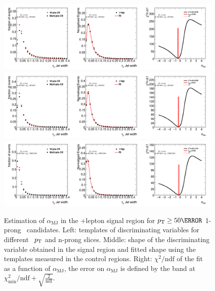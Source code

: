		\begin{figure}
		\begin{center}
		\includegraphics[width=1\textwidth]{chapters/chapter6_HPlus/images/FFs/FFs_FIT_SR_TAULEP_1_50_60.png}
		\includegraphics[width=1\textwidth]{chapters/chapter6_HPlus/images/FFs/FFs_FIT_SR_TAULEP_1_60_80.png}
		\includegraphics[width=1\textwidth]{chapters/chapter6_HPlus/images/FFs/FFs_FIT_SR_TAULEP_1_80_3500.png}
		\end{center}
		\caption{
		Estimation of $\alpha_\mathrm{MJ}$ in the \tauhad+lepton signal region for $\pt \geq 50 \GeV$
		1-prong \tauhad\ candidates. Left: templates of discriminating variables for different \tauhad\ $p_{\text{T}}$
		and n-prong slices. Middle: shape of the discriminating variable obtained in the signal region and fitted
		shape using the templates measured in the control regions. Right: $\chi^2/\mathrm{ndf}$ of the fit as a
		function of $\alpha_\mathrm{MJ}$, the error on $\alpha_\mathrm{MJ}$ is defined by the band at
		$\chi^2_\mathrm{min}/\mathrm{ndf}+\sqrt{\frac{2}{\mathrm{ndf}}}$.
		}
		\label{fig:mm:Fits:region7_2}
		\end{figure}



